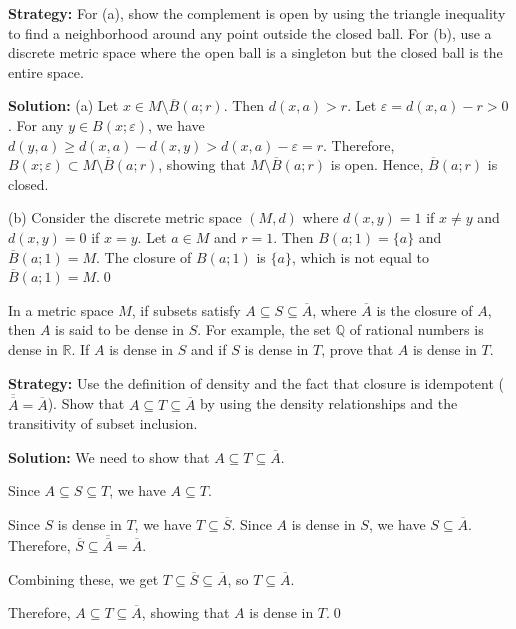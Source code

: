 \noindent\textbf{Strategy:} For (a), show the complement is open by using the triangle inequality to find a neighborhood around any point outside the closed ball. For (b), use a discrete metric space where the open ball is a singleton but the closed ball is the entire space.

\bigskip\noindent\textbf{Solution:} 
(a) Let $x \in M \setminus \overline{B}(a;r)$. Then $d(x,a) > r$. Let $\varepsilon = d(x,a) - r > 0$. For any $y \in B(x;\varepsilon)$, we have $d(y,a) \geq d(x,a) - d(x,y) > d(x,a) - \varepsilon = r$. Therefore, $B(x;\varepsilon) \subset M \setminus \overline{B}(a;r)$, showing that $M \setminus \overline{B}(a;r)$ is open. Hence, $\overline{B}(a;r)$ is closed.

(b) Consider the discrete metric space $(M,d)$ where $d(x,y) = 1$ if $x \neq y$ and $d(x,y) = 0$ if $x = y$. Let $a \in M$ and $r = 1$. Then $B(a;1) = \{a\}$ and $\overline{B}(a;1) = M$. The closure of $B(a;1)$ is $\{a\}$, which is not equal to $\overline{B}(a;1) = M$.\qed


\begin{problembox}
In a metric space \( M \), if subsets satisfy \( A \subseteq S \subseteq \overline{A} \), where \(\overline{A}\) is the closure of \( A \), then \( A \) is said to be dense in \( S \). For example, the set \( \mathbb{Q} \) of rational numbers is dense in \( \mathbb{R} \). If \( A \) is dense in \( S \) and if \( S \) is dense in \( T \), prove that \( A \) is dense in \( T \).
\end{problembox}

\noindent\textbf{Strategy:} Use the definition of density and the fact that closure is idempotent ($\overline{\overline{A}} = \overline{A}$). Show that $A \subseteq T \subseteq \overline{A}$ by using the density relationships and the transitivity of subset inclusion.

\bigskip\noindent\textbf{Solution:} We need to show that $A \subseteq T \subseteq \overline{A}$.

Since $A \subseteq S \subseteq T$, we have $A \subseteq T$.

Since $S$ is dense in $T$, we have $T \subseteq \overline{S}$. Since $A$ is dense in $S$, we have $S \subseteq \overline{A}$. Therefore, $\overline{S} \subseteq \overline{\overline{A}} = \overline{A}$.

Combining these, we get $T \subseteq \overline{S} \subseteq \overline{A}$, so $T \subseteq \overline{A}$.

Therefore, $A \subseteq T \subseteq \overline{A}$, showing that $A$ is dense in $T$.\qed


